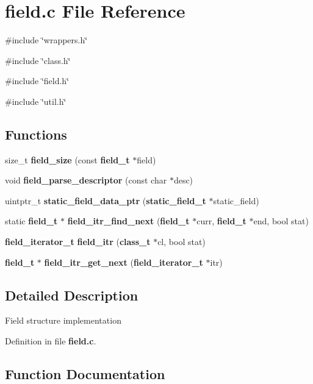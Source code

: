 \section{field.c File Reference}
\label{field_8c}
{\ttfamily \#include \char`\"{}wrappers.h\char`\"{}}\par
{\ttfamily \#include \char`\"{}class.h\char`\"{}}\par
{\ttfamily \#include \char`\"{}field.h\char`\"{}}\par
{\ttfamily \#include \char`\"{}util.h\char`\"{}}\par
\subsection*{Functions}
\begin{DoxyCompactItemize}
\item 
size\_\-t {\bf field\_\-size} (const {\bf field\_\-t} $\ast$field)
\item 
void {\bf field\_\-parse\_\-descriptor} (const char $\ast$desc)
\item 
uintptr\_\-t {\bf static\_\-field\_\-data\_\-ptr} ({\bf static\_\-field\_\-t} $\ast$static\_\-field)
\item 
static {\bf field\_\-t} $\ast$ {\bf field\_\-itr\_\-find\_\-next} ({\bf field\_\-t} $\ast$curr, {\bf field\_\-t} $\ast$end, bool stat)
\item 
{\bf field\_\-iterator\_\-t} {\bf field\_\-itr} ({\bf class\_\-t} $\ast$cl, bool stat)
\item 
{\bf field\_\-t} $\ast$ {\bf field\_\-itr\_\-get\_\-next} ({\bf field\_\-iterator\_\-t} $\ast$itr)
\end{DoxyCompactItemize}


\subsection{Detailed Description}
Field structure implementation 

Definition in file {\bf field.c}.



\subsection{Function Documentation}
